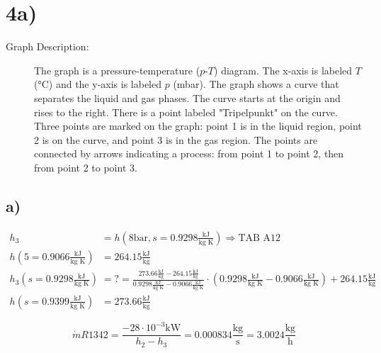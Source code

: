 

\section*{4a)}

\begin{description}
    \item[Graph Description:] The graph is a pressure-temperature ($p$-$T$) diagram. The x-axis is labeled $T$ (°C) and the y-axis is labeled $p$ (mbar). The graph shows a curve that separates the liquid and gas phases. The curve starts at the origin and rises to the right. There is a point labeled "Tripelpunkt" on the curve. Three points are marked on the graph: point 1 is in the liquid region, point 2 is on the curve, and point 3 is in the gas region. The points are connected by arrows indicating a process: from point 1 to point 2, then from point 2 to point 3.
\end{description}



\subsection*{a)}

\begin{align*}
h_3 &= h \left( 8 \text{bar}, s = 0.9298 \frac{\text{kJ}}{\text{kg K}} \right) \Rightarrow \text{TAB A12} \\
h \left( 5 = 0.9066 \frac{\text{kJ}}{\text{kg K}} \right) &= 264.15 \frac{\text{kJ}}{\text{kg}} \\
h_3 \left( s = 0.9298 \frac{\text{kJ}}{\text{kg K}} \right) &= ? = \frac{273.66 \frac{\text{kJ}}{\text{kg}} - 264.15 \frac{\text{kJ}}{\text{kg}}}{0.9298 \frac{\text{kJ}}{\text{kg K}} - 0.9066 \frac{\text{kJ}}{\text{kg K}}} \cdot \left( 0.9298 \frac{\text{kJ}}{\text{kg K}} - 0.9066 \frac{\text{kJ}}{\text{kg K}} \right) + 264.15 \frac{\text{kJ}}{\text{kg}} \\
h \left( s = 0.9399 \frac{\text{kJ}}{\text{kg K}} \right) &= 273.66 \frac{\text{kJ}}{\text{kg}}
\end{align*}

\[
\dot{m} R1342 = \frac{-28 \cdot 10^{-3} \text{kW}}{h_2 - h_3} = 0.000834 \frac{\text{kg}}{\text{s}} = 3.0024 \frac{\text{kg}}{\text{h}}
\]